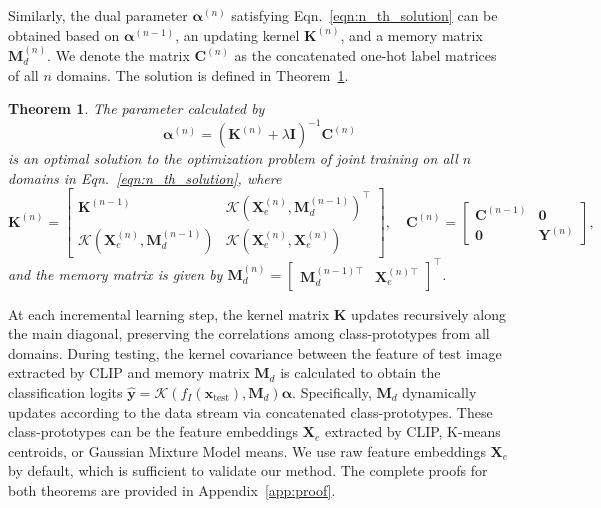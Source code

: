 \documentclass{article}
\newtheorem{theorem}{Theorem}
\begin{document}
Similarly, the dual parameter $\boldsymbol{\alpha}^{\left(n\right)}$ satisfying Eqn.~\ref{eqn:n_th_solution} can be obtained based on $\boldsymbol{\alpha}^{\left(n-1\right)}$, an updating kernel $\mathbf{K}^{\left(n\right)}$, and a memory matrix $\mathbf{M}_d^{\left(n\right)}$. We denote the matrix $\mathbf{C}^{\left(n\right)}$ as the concatenated one-hot label matrices of all $n$ domains. The solution is defined in Theorem~\ref{dual_theorem}.
\begin{theorem}
\label{dual_theorem}
The parameter calculated by
\begin{equation}
\label{eqn:alpha_update}
\boldsymbol{\alpha}^{\left(n\right)} = \left(\mathbf{K}^{\left(n\right)} + \lambda \mathbf{I}\right)^{-1}\mathbf{C}^{\left(n\right)}
\end{equation}
is an optimal solution to the optimization problem of joint training on all $n$ domains in Eqn.~\ref{eqn:n_th_solution}, where
\begin{equation}
\label{kernel_update}
\mathbf{K}^{\left(n\right)} = 
\begin{bmatrix}
\mathbf{K}^{\left(n-1\right)} & \mathcal{K}\left(\mathbf{X}_e^{\left(n\right)}, \mathbf{M}_d^{\left(n-1\right)}\right)^\top  \\
\mathcal{K}\left(\mathbf{X}_e^{\left(n\right)}, \mathbf{M}_d^{\left(n-1\right)}\right) & \mathcal{K}\left(\mathbf{X}_e^{\left(n\right)}, \mathbf{X}_e^{\left(n\right)}\right)
\end{bmatrix},
\quad
\mathbf{C}^{\left(n\right)} = 
    \begin{bmatrix} 
    \mathbf{C}^{\left(n-1\right)} & \mathbf{0} \\
    \mathbf{0} & \mathbf{Y}^{\left(n\right)}
    \end{bmatrix},
\end{equation}
and the memory matrix is given by $\mathbf{M}_d^{\left(n\right)} = \begin{bmatrix} \mathbf{M}_d^{\left(n-1\right)\top} & \mathbf{X}_e^{\left(n\right)\top} \end{bmatrix}^\top$.
\end{theorem}

At each incremental learning step, the kernel matrix $\mathbf{K}$ updates recursively along the main diagonal, preserving the correlations among class-prototypes from all domains. During testing, the kernel covariance between the feature of test image extracted by CLIP and memory matrix $\mathbf{M}_d$ is calculated to obtain the classification logits $\hat{\mathbf{y}} = \mathcal{K}\left(f_I\left(\mathbf{x}_{\text{test}}\right), \mathbf{M}_d\right)\boldsymbol{\alpha}$. Specifically, $\mathbf{M}_d$ dynamically updates according to the data stream via concatenated class-prototypes. These class-prototypes can be the feature embeddings $\mathbf{X}_e$ extracted by CLIP, K-means centroids, or Gaussian Mixture Model means. We use raw feature embeddings $\mathbf{X}_e$ by default, which is sufficient to validate our method. The complete proofs for both theorems are provided in Appendix~\ref{app:proof}.
\end{document}
